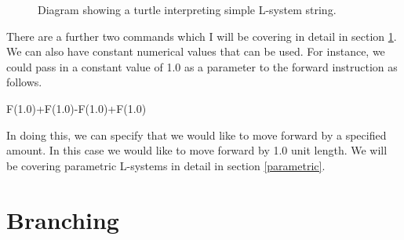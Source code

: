 \begin{flushleft}
\vspace{5mm}

\begin{figure}[htbp]
	{\centering
		\setlength{\fboxrule}{1pt}
		\vspace{7px}
		\caption{Diagram showing a turtle interpreting simple L-system string.} \label{basic turtle}
	}
\end{figure}
\FloatBarrier

\vspace{5mm}

There are a further two commands which I will be covering in detail in section \ref{branching}. We can also have constant numerical values that can be used. For instance, we could pass in a constant value of 1.0 as a parameter to the forward instruction as follows.

\vspace{5mm}

F(1.0)+F(1.0)-F(1.0)+F(1.0)

\vspace{5mm}

In doing this, we can specify that we would like to move forward by a specified amount. In this case we would like to move forward by 1.0 unit length. We will be covering parametric L-systems in detail in section \ref{parametric}.

\end{flushleft}

\section{Branching} \label{branching}

